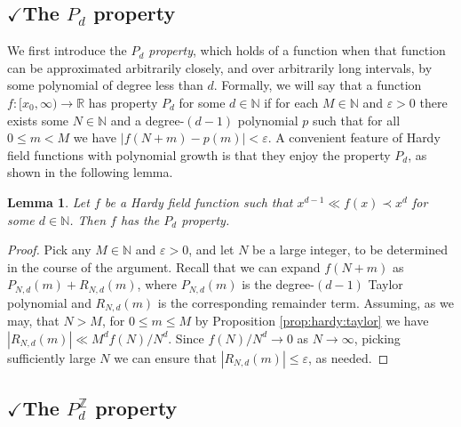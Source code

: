 \documentclass{amsart}
\newtheorem{lemma}[theorem]{Lemma}
\theoremstyle{definition}
\newcommand{\abs}[1]{\left|#1\right|}
\newcommand{\e}{\varepsilon}
\newcommand{\NN}{\mathbb{N}}
\newcommand{\ZZ}{\mathbb{Z}}
\newcommand{\RR}{\mathbb{R}}
\begin{document}
\subsection{$\checkmark$The $P_d$ property}
\label{sec:pd}
We first introduce the \emph{$P_d$ property}, which holds of a function when that function can be approximated arbitrarily closely, and over arbitrarily long intervals, by some polynomial of degree less than $d$. Formally, we will say that a function $f \colon [x_0,\infty) \to \RR$ has property $P_d$ for some $d \in \NN$ if for each $M \in \NN$ and $\e > 0$ there exists some $N \in \NN$ and a degree-$(d-1)$ polynomial $p$ such that for all $0 \leq m < M$ we have $\abs{f(N+m) - p(m)} < \e$. A convenient feature of Hardy field functions with polynomial growth is that they enjoy the property $P_d$, as shown in the following lemma.

\begin{lemma}
\label{lem:pd}
Let $f$ be a Hardy field function such that { $x^{d-1} \ll f(x) \prec x^{d}$} for some $d \in \NN$. Then $f$ has the $P_d$ property. 
\end{lemma}
\begin{proof}
Pick any $M \in \NN$ and $\e > 0$, and let $N$ be a large integer, to be determined in the course of the argument. Recall that we can expand $f(N+m)$ as { $P_{N,d}(m) + R_{N,d}(m)$}, where { $P_{N,d}(m)$} is the degree-{$(d-1)$} Taylor polynomial and { $R_{N,d}(m)$} is the corresponding remainder term. Assuming, as we may, that $N > M$, for $0 \leq m \leq M$ by Proposition \ref{prop:hardy:taylor} we have $\abs{R_{N,{ d}}(m)} \ll M^{{ d}} f(N)/N^{{ d}}$. Since $f(N)/N^{{ d}} \to 0$ as $N \to \infty$, picking sufficiently large $N$ we can ensure that $\abs{R_{N,{ d}}(m)} \leq \e$, as needed.
\end{proof}

\newcommand{\Pint}{P^{\ZZ}}

\subsection{$\checkmark$The $\Pint_d$ property}
\end{document}
